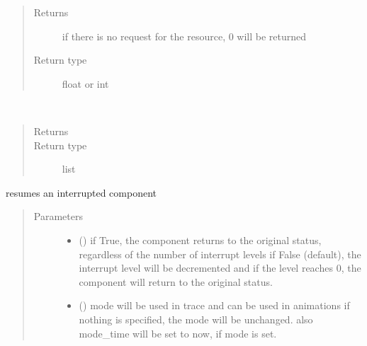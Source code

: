 \documentclass[letterpaper,10pt,english]{sphinxmanual}
\begin{document}
\begin{fulllineitems}
\begin{fulllineitems}
\begin{quote}
\begin{description}
\item[{Returns}] \leavevmode
{} \textendash{} if there is no request for the resource, 0 will be returned

\item[{Return type}] \leavevmode
float or int

\end{description}\end{quote}

\end{fulllineitems}


\begin{fulllineitems}
\label{\detokenize{Reference:salabim.Component.requested_resources}}~\begin{quote}\begin{description}
\item[{Returns}] \leavevmode
{}

\item[{Return type}] \leavevmode
list

\end{description}\end{quote}

\end{fulllineitems}


\begin{fulllineitems}
\label{\detokenize{Reference:salabim.Component.resume}}
resumes an interrupted component
\begin{quote}\begin{description}
\item[{Parameters}] \leavevmode\begin{itemize}
\item {} 
 () \textendash{} if True, the component returns to the original status, regardless of the number of interrupt levels 
if False (default), the interrupt level will be decremented and if the level reaches 0,
the component will return to the original status.

\item {} 
 () \textendash{} mode 
will be used in trace and can be used in animations 
if nothing is specified, the mode will be unchanged. 
also mode\_time will be set to now, if mode is set.


\end{itemize}
\end{description}
\end{quote}
\end{fulllineitems}
\end{fulllineitems}
\end{document}
